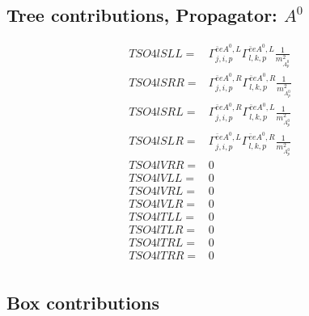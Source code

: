 \documentclass[A4,landscape]{article}
\begin{document}
\subsection{Tree contributions, Propagator: $A^0$} 

\begin{align} 
  TSO4lSLL= & \Gamma^{\bar{e}e A^0 ,L}_{j, i, p} \Gamma^{\bar{e}e A^0 ,L}_{l, k, p} \frac{1}{m^2_{A^0_{{p}}}} \\ 
  TSO4lSRR= & \Gamma^{\bar{e}e A^0 ,R}_{j, i, p} \Gamma^{\bar{e}e A^0 ,R}_{l, k, p} \frac{1}{m^2_{A^0_{{p}}}} \\ 
  TSO4lSRL= & \Gamma^{\bar{e}e A^0 ,R}_{j, i, p} \Gamma^{\bar{e}e A^0 ,L}_{l, k, p} \frac{1}{m^2_{A^0_{{p}}}} \\ 
  TSO4lSLR= & \Gamma^{\bar{e}e A^0 ,L}_{j, i, p} \Gamma^{\bar{e}e A^0 ,R}_{l, k, p} \frac{1}{m^2_{A^0_{{p}}}} \\ 
  TSO4lVRR= & 0 \\ 
  TSO4lVLL= & 0 \\ 
  TSO4lVRL= & 0 \\ 
  TSO4lVLR= & 0 \\ 
  TSO4lTLL= & 0 \\ 
  TSO4lTLR= & 0 \\ 
  TSO4lTRL= & 0 \\ 
  TSO4lTRR= & 0 \\ 
\end{align} 
\subsection{Box contributions} 
\end{document}
